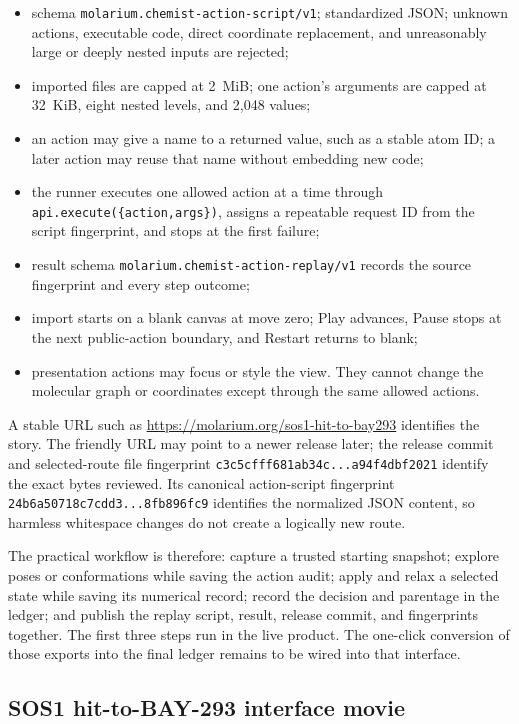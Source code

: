\begin{itemize}
  \item schema \texttt{molarium.chemist-action-script/v1}; standardized JSON;
    unknown actions, executable code, direct coordinate replacement, and
    unreasonably large or deeply nested inputs are rejected;
  \item imported files are capped at 2~MiB; one action's arguments are capped at
    32~KiB, eight nested levels, and 2,048 values;
  \item an action may give a name to a returned value, such as a stable atom ID;
    a later action may reuse that name without embedding new code;
  \item the runner executes one allowed action at a time through
    \texttt{api.execute(\{action,args\})}, assigns a repeatable request ID from
    the script fingerprint, and stops at the first failure;
  \item result schema \texttt{molarium.chemist-action-replay/v1} records the
    source fingerprint and every step outcome;
  \item import starts on a blank canvas at move zero; Play advances, Pause stops
  at the next public-action boundary, and Restart returns to blank;
  \item presentation actions may focus or style the view. They cannot change the
    molecular graph or coordinates except through the same allowed actions.
\end{itemize}

A stable URL such as \url{https://molarium.org/sos1-hit-to-bay293} identifies the
story. The friendly URL may point to a newer release later; the release commit
and selected-route file fingerprint
\texttt{c3c5cfff681ab34c...a94f4dbf2021} identify the exact bytes reviewed. Its
canonical action-script fingerprint
\texttt{24b6a50718c7cdd3...8fb896fc9} identifies the normalized JSON content, so
harmless whitespace changes do not create a logically new route.

The practical workflow is therefore: capture a trusted starting snapshot;
explore poses or conformations while saving the action audit; apply and relax a
selected state while saving its numerical record; record the decision and
parentage in the ledger; and publish the replay script, result, release commit,
and fingerprints together. The first three steps run in the live product. The
one-click conversion of those exports into the final ledger remains to be wired
into that interface.

\subsection{SOS1 hit-to-BAY-293 interface movie}
\label{app:sos1-movie}

